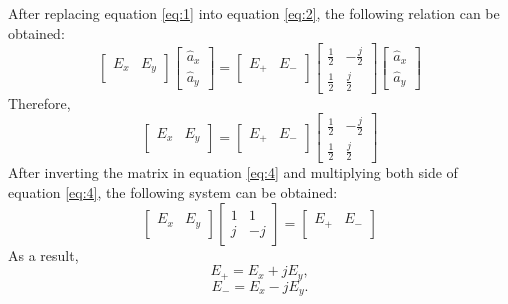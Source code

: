 \documentclass[11pt]{amsart}
\begin{document}
After replacing equation \ref{eq:1} into equation \ref{eq:2}, the following relation can be obtained:
\begin{equation}
\label{eq:3}
\begin{bmatrix}
 E_x &  E_y \\ 
\end{bmatrix}
\begin{bmatrix}
 \hat{a}_x  \\ 
\hat{a}_y
\end{bmatrix}
=
\begin{bmatrix}
 E_+ &  E_- \\ 
\end{bmatrix}
\begin{bmatrix}
 \frac{1}{2} & -\frac{j}{2} \\ 
\frac{1}{2} &  \frac{j}{2}
\end{bmatrix}
\begin{bmatrix}
 \hat{a}_x  \\ 
\hat{a}_y
\end{bmatrix}
\end{equation}
Therefore,
\begin{equation}
\label{eq:4}
\begin{bmatrix}
 E_x &  E_y \\ 
\end{bmatrix}
=
\begin{bmatrix}
 E_+ &  E_- \\ 
\end{bmatrix}
\begin{bmatrix}
 \frac{1}{2} & -\frac{j}{2} \\ 
\frac{1}{2} &  \frac{j}{2}
\end{bmatrix}
\end{equation}
After inverting the matrix in equation \ref{eq:4} and multiplying both side of equation \ref{eq:4}, the following system can be obtained:
\begin{equation}
\label{eq:5}
\begin{bmatrix}
 E_x &  E_y \\ 
\end{bmatrix}
\begin{bmatrix}
 1 & 1 \\ 
j &  -j
\end{bmatrix}
=
\begin{bmatrix}
 E_+ &  E_- \\ 
\end{bmatrix}
\end{equation}
As a result,
\begin{equation}
 E_+ = E_x + jE_y,
\end{equation}
\begin{equation}
 E_- = E_x - jE_y.
\end{equation}
\end{document}
